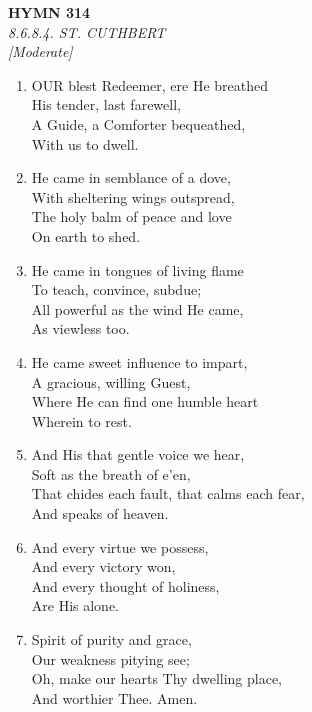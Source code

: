 \newpage
\begin{center}
    {\Large \textbf{HYMN 314}}
    \\
    \textit{8.6.8.4. ST. CUTHBERT}
    \\
    \textit{\small [Moderate]}
\end{center}
\vspace{1em}

\begin{enumerate}
    \item OUR blest Redeemer, ere He breathed \\
        His tender, last farewell, \\
        A Guide, a Comforter bequeathed, \\
        With us to dwell.

    \item He came in semblance of a dove, \\
        With sheltering wings outspread, \\
        The holy balm of peace and love \\
        On earth to shed.

    \item He came in tongues of living flame \\
        To teach, convince, subdue; \\
        All powerful as the wind He came, \\
        As viewless too.

    \item He came sweet influence to impart, \\
        A gracious, willing Guest, \\
        Where He can find one humble heart \\
        Wherein to rest.

    \item And His that gentle voice we hear, \\
        Soft as the breath of e'en, \\
        That chides each fault, that calms each fear, \\
        And speaks of heaven.

    \item And every virtue we possess, \\
        And every victory won, \\
        And every thought of holiness, \\
        Are His alone.

    \item Spirit of purity and grace, \\
        Our weakness pitying see; \\
        Oh, make our hearts Thy dwelling place, \\
        And worthier Thee. Amen.

\end{enumerate}

